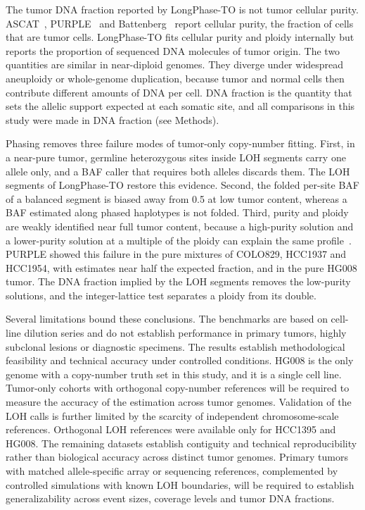 \documentclass[unnumsec,webpdf,contemporary,large]{oup-authoring-template}
\begin{document}
The tumor DNA fraction reported by LongPhase-TO is not tumor cellular purity. ASCAT~\cite{vanloo2010}, PURPLE~\cite{priestley2019} and Battenberg~\cite{nikzainal2012} report cellular purity, the fraction of cells that are tumor cells. LongPhase-TO fits cellular purity and ploidy internally but reports the proportion of sequenced DNA molecules of tumor origin. The two quantities are similar in near-diploid genomes. They diverge under widespread aneuploidy or whole-genome duplication, because tumor and normal cells then contribute different amounts of DNA per cell. DNA fraction is the quantity that sets the allelic support expected at each somatic site, and all comparisons in this study were made in DNA fraction (see Methods).

Phasing removes three failure modes of tumor-only copy-number fitting. First, in a near-pure tumor, germline heterozygous sites inside LOH segments carry one allele only, and a BAF caller that requires both alleles discards them. The LOH segments of LongPhase-TO restore this evidence. Second, the folded per-site BAF of a balanced segment is biased away from 0.5 at low tumor content, whereas a BAF estimated along phased haplotypes is not folded. Third, purity and ploidy are weakly identified near full tumor content, because a high-purity solution and a lower-purity solution at a multiple of the ploidy can explain the same profile~\cite{vanloo2010,priestley2019}. PURPLE showed this failure in the pure mixtures of COLO829, HCC1937 and HCC1954, with estimates near half the expected fraction, and in the pure HG008 tumor. The DNA fraction implied by the LOH segments removes the low-purity solutions, and the integer-lattice test separates a ploidy from its double.

Several limitations bound these conclusions. The benchmarks are based on cell-line dilution series and do not establish performance in primary tumors, highly subclonal lesions or diagnostic specimens. The results establish methodological feasibility and technical accuracy under controlled conditions. HG008 is the only genome with a copy-number truth set in this study, and it is a single cell line. Tumor-only cohorts with orthogonal copy-number references will be required to measure the accuracy of the estimation across tumor genomes. Validation of the LOH calls is further limited by the scarcity of independent chromosome-scale references. Orthogonal LOH references were available only for HCC1395 and HG008. The remaining datasets establish contiguity and technical reproducibility rather than biological accuracy across distinct tumor genomes. Primary tumors with matched allele-specific array or sequencing references, complemented by controlled simulations with known LOH boundaries, will be required to establish generalizability across event sizes, coverage levels and tumor DNA fractions.
\end{document}
